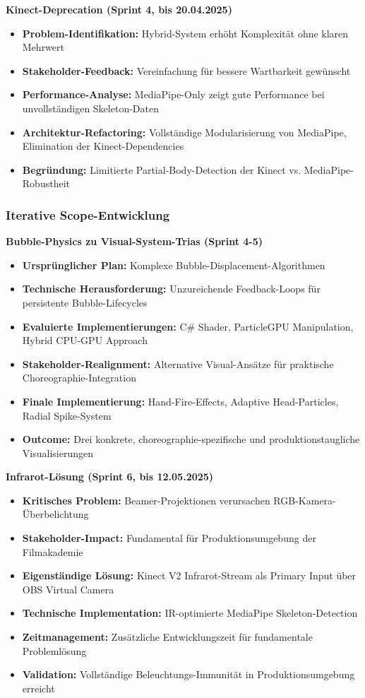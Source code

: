 \textbf{Kinect-Deprecation (Sprint 4, bis 20.04.2025)}
\begin{itemize}
    \item \textbf{Problem-Identifikation:} Hybrid-System erhöht Komplexität ohne klaren Mehrwert
    \item \textbf{Stakeholder-Feedback:} Vereinfachung für bessere Wartbarkeit gewünscht
    \item \textbf{Performance-Analyse:} MediaPipe-Only zeigt gute Performance bei unvollständigen Skeleton-Daten
    \item \textbf{Architektur-Refactoring:} Vollständige Modularisierung von MediaPipe, Elimination der Kinect-Dependencies
    \item \textbf{Begründung:} Limitierte Partial-Body-Detection der Kinect vs. MediaPipe-Robustheit
\end{itemize}

\subsubsection{Iterative Scope-Entwicklung}

\textbf{Bubble-Physics zu Visual-System-Trias (Sprint 4-5)}
\begin{itemize}
    \item \textbf{Ursprünglicher Plan:} Komplexe Bubble-Displacement-Algorithmen
    \item \textbf{Technische Herausforderung:} Unzureichende Feedback-Loops für persistente Bubble-Lifecycles
    \item \textbf{Evaluierte Implementierungen:} C\# Shader, ParticleGPU Manipulation, Hybrid CPU-GPU Approach
    \item \textbf{Stakeholder-Realignment:} Alternative Visual-Ansätze für praktische Choreographie-Integration
    \item \textbf{Finale Implementierung:} Hand-Fire-Effects, Adaptive Head-Particles, Radial Spike-System
    \item \textbf{Outcome:} Drei konkrete, choreographie-spezifische und produktionstaugliche Visualisierungen
\end{itemize}

\textbf{Infrarot-Lösung (Sprint 6, bis 12.05.2025)}
\begin{itemize}
    \item \textbf{Kritisches Problem:} Beamer-Projektionen verursachen RGB-Kamera-Überbelichtung
    \item \textbf{Stakeholder-Impact:} Fundamental für Produktionsumgebung der Filmakademie
    \item \textbf{Eigenständige Lösung:} Kinect V2 Infrarot-Stream als Primary Input über OBS Virtual Camera
    \item \textbf{Technische Implementation:} IR-optimierte MediaPipe Skeleton-Detection
    \item \textbf{Zeitmanagement:} Zusätzliche Entwicklungszeit für fundamentale Problemlösung
    \item \textbf{Validation:} Vollständige Beleuchtungs-Immunität in Produktionsumgebung erreicht
\end{itemize}

